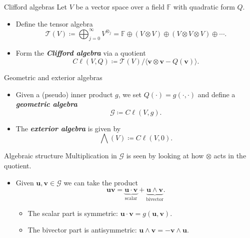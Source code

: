 \documentclass[aspectratio=169]{beamer}
\newcommand\boldgreen[1]{\textcolor{lighter_csu_green}{\emph{\textbf{#1}}}}
\newcommand{\G}{\mathcal{G}}
\newcommand{\blade}[1]{\boldsymbol{#1}}
\begin{document}
\begin{frame}{Clifford algebras}
\vfill
\pause
Let $V$ be a vector space over a field $\mathbb{F}$ with quadratic form $Q$.
\begin{itemize}
        \pause
        \item Define the tensor algebra
        \[
        \mathcal{T}(V) \coloneqq \bigoplus_{j=0}^\infty V^{\otimes_j} = \mathbb{F} \oplus (V \otimes V) \oplus (V \otimes V \otimes V) \oplus \cdots.
        \]
        \pause
        \item Form the \boldgreen{Clifford algebra} via a quotient
        \[
        C\ell(V,Q) \coloneqq \mathcal{T}(V)/ \langle \blade{v} \otimes \blade{v} - Q(\blade{v})\rangle.
        \]
\end{itemize}
\vfill
\end{frame}

\begin{frame}{Geometric and exterior algebras}
\vfill
\begin{itemize}
        \pause
        \item Given a (pseudo) inner product $g$, we set $Q(\cdot)=g(\cdot,\cdot)$ and define a \boldgreen{geometric algebra}
        \[
        \G \coloneqq C\ell(V,g).
        \]
        \pause
        \item The \boldgreen{exterior algebra} is given by
        \[
        \bigwedge(V) \coloneqq C\ell(V,0).
        \]
\end{itemize}
\vfill
\end{frame}

\begin{frame}{Algebraic structure}
\vfill
\pause
Multiplication in $\G$ is seen by looking at how $\otimes$ acts in the quotient.
\begin{itemize}
    \pause
    \item Given $\blade{u}, \blade{v} \in \G$ we can take the product
    \[
    \blade{u}\blade{v} = \underbrace{\blade{u}\cdot \blade{v}}_{\textrm{scalar}} + \underbrace{\blade{u}\wedge \blade{v}}_{\textrm{bivector}}.
    \]
\begin{itemize}
    \pause
    \item The scalar part is symmetric: $\blade{u}\cdot \blade{v} = g(\blade{u},\blade{v})$.
    \pause
    \item The bivector part is antisymmetric: $\blade{u}\wedge \blade{v} = -\blade{v}\wedge \blade{u}$.
\end{itemize}
\end{itemize}
\vfill
\end{frame}
\end{document}
